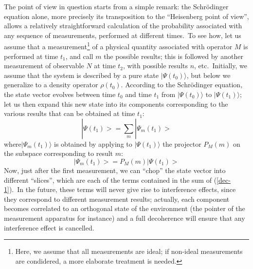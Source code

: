\documentclass[12pt,onecolumn]{article}%
\begin{document}
The point of view in question starts from a simple remark: the Schr\"{o}dinger
equation alone, more precisely its transposition to the ``Heisenberg point of
view'', allows a relatively straightforward calculation of the probability
associated with any sequence of measurements, performed at different
times.\ To see how, let us assume that a measurement\footnote{Here, we assume
that all measurements are ideal; if non-ideal measurements are condidered, a
more elaborate treatment is needed.} of a physical quantity associated with
operator $M$ is performed at time $t_{1}$, and call $m$ the possible results;
this is followed by another measurement of observable $N$ at time $t_{2}$,
with possible results $n$, etc.\ Initially, we assume that the system is
described by a pure state $|\Psi(t_{0})\rangle$, but below we generalize to a
density operator $\rho(t_{0})$. According to the Schr\"{o}dinger equation, the
state vector evolves between time $t_{0}$ and time $t_{1}$ from $|
\Psi(t_{0})\rangle$ to $|\Psi(t_{1})\rangle$; let us then expand this new state into
its components corresponding to the various results that can be obtained at
time $t_{1}$:%
\begin{equation}
|\Psi(t_{1})>=\sum_{m}|\Psi_{m}(t_{1})> \label{dec-1}%
\end{equation}
where$|\Psi_{m}(t_{1})\rangle$ is obtained by applying to $|\Psi(t_{1})\rangle$ the
projector $P_{M}(m)$ on the subspace corresponding to result $m$:
\begin{equation}
|\Psi_{m}(t_{1})>=P_{M}(m)|\Psi(t_{1})> \label{dec-2}%
\end{equation}
Now, just after the first measurement, we can ``chop'' the state vector into
different ``slices'', which are each of the terms contained in the sum of
(\ref{dec-1}).\ In the future, these terms will never give rise to
interference effects, since they correspond to different measurement results;
actually, each component becomes correlated to an orthogonal state of the
environment (the pointer of the measurement apparatus for instance) and a full
decoherence will ensure that any interference effect is cancelled.
\end{document}
